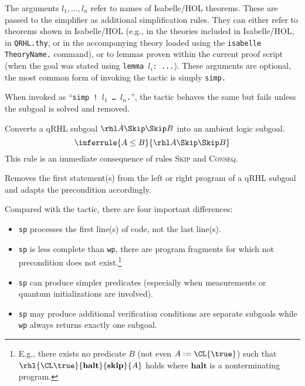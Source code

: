 \documentclass{article}
\renewcommand\rulerefx[1]{\hbox{\textsc{#1}}}
\begin{document}
The arguments $l_1,\dots,l_n$
refer to names of Isabelle/HOL theorems. These are passed to the
simplifier as additional simplification rules. They can either refer
to theorems shown in Isabelle/HOL (e.g., in the theories included in
Isabelle/HOL, in \texttt{QRHL.thy}, or in the accompanying theory
loaded using the \texttt{isabelle TheoryName.} command), or to lemmas
proven within the current proof script (when the goal was stated using
\texttt{\frenchspacing lemma $l_i$:
  ...}).  These arguments are optional, the most common form of
invoking the tactic is simply \texttt{simp.}


When invoked as ``\texttt{simp ! $l_1$
  \dots{} $l_n$.}'',
the tactic behaves the same but fails unless the subgoal is solved and
removed.



Converts a qRHL subgoal $\rhl A\Skip\Skip B$
into an ambient logic subgoal.
\[
\inferrule{
  A \leq B
}{
  \rhl A \Skip \Skip B
}
\]
This rule is an immediate consequence of rules \rulerefx{Skip} and \rulerefx{Conseq}.


Removes the first statement(s) from the left or right program of a qRHL
subgoal and adapts the precondition accordingly.

Compared with the  tactic, there are four important differences:
\begin{itemize}
\item \texttt{sp} processes the first line(s) of code, not the last line(s).
\item \texttt{sp} is less complete than \texttt{wp}, there are program fragments for which not precondition does not exist.\footnote{%
    E.g., there exists no predicate $B$ (not even $A:=\CL{\true}$) such that $\rhl {\CL\true}{\mathbf{halt}}{\mathbf{skip}}{A}$ holds where $\mathbf{halt}$ is a nonterminating program.}
\item \texttt{sp} can produce simpler predicates (especially when measurements or quantum initializations are involved).
\item \texttt{sp} may produce additional verification conditions are separate subgoals while \texttt{wp} always returns exactly one subgoal.
\end{itemize}

\bigskip

\newcommand\SP{\operatorname{sp}}%
\end{document}
